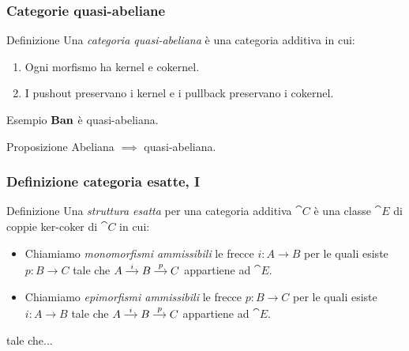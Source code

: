 \documentclass{beamer}
\begin{document}
\begin{frame}[fragile]
  \frametitle{Categorie quasi-abeliane}

  \begin{block}{Definizione}
    Una {\em categoria quasi-abeliana} è una categoria additiva in cui:
    \begin{enumerate}
    \item Ogni morfismo ha kernel e cokernel.
    \item I pushout preservano i kernel e i pullback preservano i cokernel.
    \end{enumerate}
  \end{block}

  \begin{block}{Esempio}
    \(\mathbf{Ban}\) è quasi-abeliana.
  \end{block}

  \begin{block}{Proposizione}
    Abeliana \(\implies\) quasi-abeliana.
  \end{block}
  
\end{frame}

\begin{frame}[fragile]
  \frametitle{Definizione categoria esatte, I}

  \begin{block}{Definizione}
    Una {\em struttura esatta} per una categoria additiva \(\cat C\) è una
  classe \(\cat E\) di coppie ker-coker di \(\cat C\) in cui:
  \begin{itemize}
  \item Chiamiamo {\em monomorfismi ammissibili} le frecce
    \(i : A \to B\) per le quali esiste \(p : B \to C\) tale che
    \(\begin{tikzcd}[column sep=small, cramped] A \ar["{i}", r] & B
      \ar["{p}", r] & C \end{tikzcd}\) appartiene ad \(\cat E\). %
  \item Chiamiamo {\em epimorfismi ammissibili} le frecce
    \(p : B \to C\) per le quali esiste \(i : A \to B\) tale che
    \(\begin{tikzcd}[column sep=small, cramped] A \ar["{i}", r] & B
      \ar["{p}", r] & C \end{tikzcd}\) appartiene ad \(\cat E\). %
  \end{itemize}
  tale che...
  \end{block}
  
\end{frame}
\end{document}
